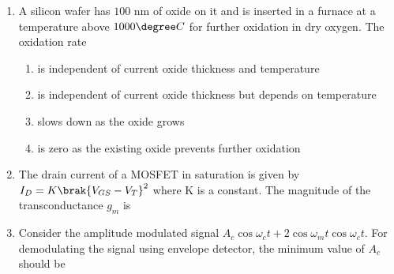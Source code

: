 \documentclass[a4paper, 11pt]{article}
\begin{document}
\begin{enumerate}
    \hfill{}
    
    \item A silicon wafer has $100$ nm of oxide on it and is inserted in a furnace at a temperature above $1000\degree C$ for further oxidation in dry oxygen. The oxidation rate
    \begin{enumerate}
        \item is independent of current oxide thickness and temperature
        \item is independent of current oxide thickness but depends on temperature
        \item slows down as the oxide grows
        \item is zero as the existing oxide prevents further oxidation
    \end{enumerate}
    
    \hfill{}

    \item The drain current of a MOSFET in saturation is given by $I_D = K\brak{V_{GS}-V_T}^2$ where K is a constant. The magnitude of the transconductance $g_m$ is
    
    \begin{enumerate}
    \end{enumerate}

    \hfill{}

    \item Consider the amplitude modulated  signal $A_c \cos\omega_c t + 2 \cos\omega_m t \cos\omega_c t$. For demodulating the signal using envelope detector, the minimum value of $A_c$ should be
    
    \begin{enumerate}
    \end{enumerate}
    

\end{enumerate}
\end{document}
